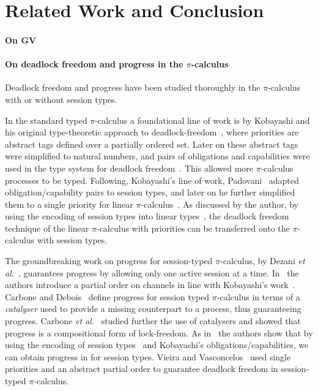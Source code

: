 \documentclass[main.tex]{subfiles}
\begin{document}
\section{Related Work and Conclusion}

\paragraph{On GV}

\paragraph{On deadlock freedom and progress in the $\pi$-calculus}
Deadlock freedom and progress have been studied thoroughly in the $\pi$-calculus with or without session types.

In the standard typed $\pi$-calculus a foundational line of work is by Kobayashi and his original type-theoretic approach to deadlock-freedom~\cite{kobayashi98}, where priorities are abstract tags defined over a partially ordered set. Later on these abstract tags were simplified to natural numbers, and pairs of obligations and capabilities were used in the type system for deadlock freedom~\cite{kobayashi02,kobayashi06}. This allowed more $\pi$-calculus processes to be typed. Following, Kobayashi's line of work, Padovani~\cite{padovani13} adapted obligation/capability pairs to session types, and later on he further simplified them to a single priority for linear $\pi$-calculus~\cite{padovani14}. As discussed by the author, by using the encoding of session types into linear types~\cite{kobayashi07,dardhagiachino12,dardha14beat,dardha16}, the deadlock freedom technique of the linear $\pi$-calculus with priorities can be transferred onto the $\pi$-calculus with session types.

The groundbreaking work on progress for session-typed $\pi$-calculus, by Dezani \emph{et al.}~\cite{dezani-ciancaglinimostrous06}, guarantees progress by allowing only one active session at a time. In~\cite{dezani-ciancagliniliguoro09progress} the authors introduce a partial order on channels in line with Kobayashi's work~\cite{kobayashi98}. Carbone and Debois~\cite{carbonedebois10} define progress for session typed $\pi$-calculus in terms of a \emph{catalyser} used to provide a missing counterpart to a process, thus guaranteeing progress.
Carbone \emph{et al.}~\cite{carbonedardha14} studied further the use of catalysers and showed that progress is a compositional form of lock-freedom. As in~\cite{padovani14} the authors show that by using the encoding of session types~\cite{dardhagiachino12} and Kobayashi's obligations/capabilities, we can obtain progress in for session types. Vieira and Vasconcelos~\cite{vieiravasconcelos13} used single priorities and an abstract partial order to guarantee deadlock freedom in session-typed $\pi$-calculus.
\end{document}
